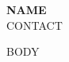 \documentclass[10.5pt,letterpaper]{article}
\begin{document}
\begin{center}
{\LARGE\bfseries {{NAME}}}\\[3pt]
{\small {{CONTACT}}}
\end{center}
\vspace{-4pt}
{{BODY}}
\end{document}
